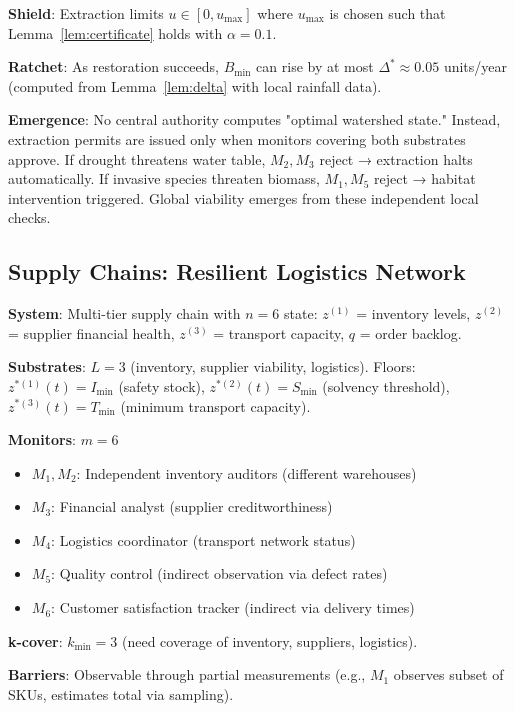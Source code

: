 \documentclass[11pt,a4paper]{article}
\begin{document}
\textbf{Shield}: Extraction limits $u \in [0, u_{\max}]$ where $u_{\max}$ is chosen such that Lemma~\ref{lem:certificate} holds with $\alpha = 0.1$.

\textbf{Ratchet}: As restoration succeeds, $B_{\min}$ can rise by at most $\Delta^* \approx 0.05$ units/year (computed from Lemma~\ref{lem:delta} with local rainfall data).

\textbf{Emergence}: No central authority computes "optimal watershed state." Instead, extraction permits are issued only when monitors covering both substrates approve. If drought threatens water table, $M_2, M_3$ reject → extraction halts automatically. If invasive species threaten biomass, $M_1, M_5$ reject → habitat intervention triggered. Global viability emerges from these independent local checks.

\subsection{Supply Chains: Resilient Logistics Network}

\textbf{System}: Multi-tier supply chain with $n=6$ state: $z^{(1)}$ = inventory levels, $z^{(2)}$ = supplier financial health, $z^{(3)}$ = transport capacity, $q$ = order backlog.

\textbf{Substrates}: $L=3$ (inventory, supplier viability, logistics). Floors: $z^{*(1)}(t) = I_{\min}$ (safety stock), $z^{*(2)}(t) = S_{\min}$ (solvency threshold), $z^{*(3)}(t) = T_{\min}$ (minimum transport capacity).

\textbf{Monitors}: $m=6$
\begin{itemize}
\item $M_1, M_2$: Independent inventory auditors (different warehouses)
\item $M_3$: Financial analyst (supplier creditworthiness)
\item $M_4$: Logistics coordinator (transport network status)
\item $M_5$: Quality control (indirect observation via defect rates)
\item $M_6$: Customer satisfaction tracker (indirect via delivery times)
\end{itemize}

\textbf{k-cover}: $k_{\min} = 3$ (need coverage of inventory, suppliers, logistics).

\textbf{Barriers}: Observable through partial measurements (e.g., $M_1$ observes subset of SKUs, estimates total via sampling).
\end{document}
